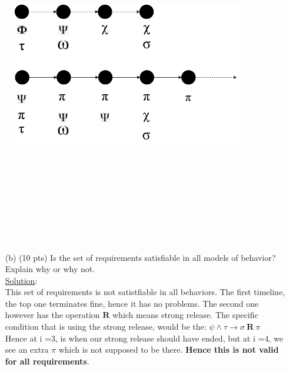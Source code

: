 \documentclass[12pt]{article}
\begin{document}
\begin{enumerate}
\begin{itemize}
\begin{figure}[h!]
\includegraphics[width=0.9\textwidth, height = 15cm, keepaspectratio]{images/SOEN331_A4_Q6a.png}
\end{figure}
\begin{itemize}
\item[(b)](10 pts) Is the set of requirements satisfiable in all models of behavior? Explain
why or why not. \\
\noindent \underline{Solution}:\\ This set of requirements is not satistfiable in all behaviors. The first timeline, the top one terminates fine, hence it has no problems. The second one however has the operation $ \textbf{R} $ which means strong release. The specific condition that is using the strong release, would be the:
$\psi \wedge \tau \rightarrow \sigma \ \textbf{R} \ \pi $ \\
Hence at i =3, is when our strong release should have ended, but at i =4, we see an extra $ \pi $ which is not supposed to be there. \textbf{Hence this is not valid for all requirements}.  \\


\end{itemize}
\end{itemize}
\end{enumerate}
\end{document}
